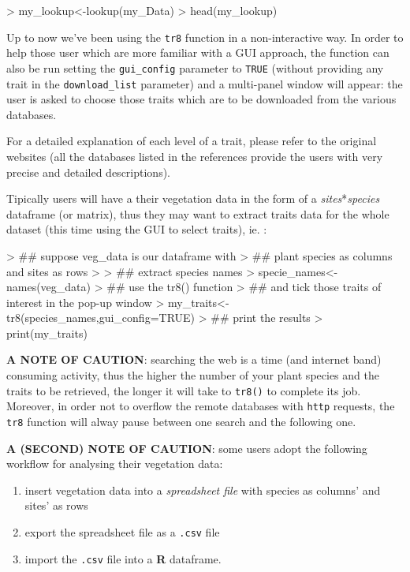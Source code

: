 \documentclass{article}
\begin{document}
\begin{Schunk}
\begin{Sinput}
> my_lookup<-lookup(my_Data)
> head(my_lookup)
\end{Sinput}
\end{Schunk}

    Up to now we've been using the \texttt{tr8} function in a non-interactive way. In order to help those user which are more familiar with a GUI approach,
    the function can also be run setting the \texttt{gui\_config} parameter to \texttt{TRUE} (without providing any trait in the \texttt{download\_list} parameter) and a multi-panel window will appear: the user is asked to choose those
  traits which are to be downloaded from the various databases.

  For a detailed explanation of each level of a trait, please refer to
  the original websites (all the databases listed in the references
  provide the users with very precise and detailed descriptions).

   Tipically users will have a their vegetation data in the form of a
   \textit{sites}*\textit{species} dataframe (or matrix), thus they
   may want to extract traits data for the whole dataset (this time using the GUI to select traits), ie. :
   
\begin{Schunk}
\begin{Sinput}
> ## suppose veg_data is our dataframe with
> ## plant species as columns and sites as rows
> 
> ## extract species names
> specie_names<-names(veg_data)
> ## use the tr8() function
> ## and tick those traits of interest in the pop-up window
> my_traits<-tr8(species_names,gui_config=TRUE)
> ## print the results
> print(my_traits)
\end{Sinput}
\end{Schunk}


  
  \textbf{A NOTE OF CAUTION}: searching the web is a time (and
  internet band) consuming activity, thus the higher the number of
  your plant species and the traits to be retrieved, the longer it will take to \texttt{tr8()} to complete its job. Moreover, in order
  not to overflow the remote databases with \texttt{http} requests, the \texttt{tr8} function will alway pause between one search and the following one.

  \textbf{A (SECOND) NOTE OF CAUTION}: some users adopt the following workflow for analysing their vegetation data:

  \begin{enumerate}
  \item insert vegetation data into a \textit{spreadsheet file} with species as
  columns' and sites' as rows
\item export the spreadsheet file as a \texttt{.csv} file
\item import the \texttt{.csv} file into a \textbf{R} dataframe.
  \end{enumerate}
  
\end{document}
